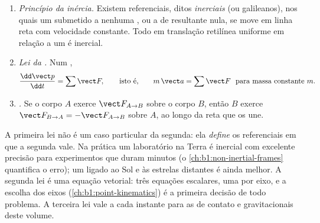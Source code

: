 \begin{theorem}\label{thm:b1:newton-dynamics:laws}
\begin{enumerate}
  \item \emph{Princípio da inércia.} Existem referenciais, ditos
        \emph{inerciais} (ou galileanos), nos quais um  submetido
        a nenhuma , ou a  de resultante nula, se move em linha
        reta com velocidade constante. Todo  em translação
        retilínea uniforme em relação a um  é inercial.
  \item \emph{Lei da .} Num ,
        \[
        \frac{\dd\vect p}{\dd t} = \sum\vect F, \qquad \text{isto é,}\qquad
        m\,\vect a = \sum\vect F \ \text{ para massa constante } m .
        \]
  \item \emph{.} Se o corpo $A$ exerce $\vect F_{A\to B}$
        sobre o corpo $B$, então $B$ exerce $\vect F_{B\to A} = -\vect F_{A\to B}$
        sobre $A$, ao longo da reta que os une.
\end{enumerate}
\end{theorem}
\admitted

\begin{remark}\label{rem:b1:newton-dynamics:meaning}
A primeira lei não é um caso particular da segunda: ela \emph{define}
os referenciais em que a segunda vale. Na prática um laboratório na
Terra é inercial com excelente precisão para experimentos que duram minutos
(o \cref{ch:b1:non-inertial-frames} quantifica o erro); um 
ligado ao Sol e às estrelas distantes é ainda melhor. A segunda
lei é uma equação vetorial: três equações escalares, uma por eixo, e
a escolha dos eixos (\cref{ch:b1:point-kinematics}) é a primeira
decisão de todo problema. A terceira lei vale a cada instante para
as  de contato e gravitacionais deste volume.
\end{remark}

